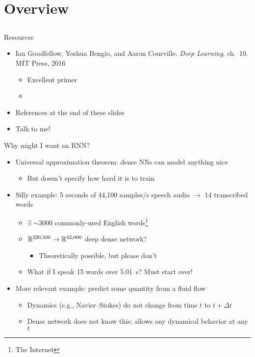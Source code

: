 \section{Overview}
\subsection{}

\begin{frame}{Resources}
    \begin{itemize}
        \item Ian Goodfellow, Yoshua Bengio, and Aaron Courville.
        \emph{Deep Learning}, ch.~10. MIT Press, 2016
        \nocite{GoodfellowDL}
        \begin{itemize}
            \item Excellent primer
            \item {}
        \end{itemize}
        \item References at the end of these slides
        \item Talk to me! \smiley
    \end{itemize}
\end{frame}

\begin{frame}{Why might I want an RNN?}
    \begin{itemize}
        \item<+-> Universal approximation theorem: dense NNs can model anything nice
        \begin{itemize}
            \item But doesn't specify how hard it is to train
        \end{itemize}
        \item<+-> Silly example: 5 seconds of 44,100 samples/s speech audio $\rightarrow$ 14 transcribed words
        \begin{itemize}
            \item $\exists$ $\sim$3000 commonly-used English words\footnote{The Internet}
            \item $\mathbb{R}^{220,500} \to \mathbb{R}^{42,000}$ deep dense network?
            \begin{itemize}
                \item Theoretically possible, but please don't
            \end{itemize}
            \item What if I speak 15 words over 5.01~s?
            Must start over!
        \end{itemize}
        \item<+-> More relevant example: predict some quantity from a fluid flow
        \begin{itemize}
            \item Dynamics (e.g., Navier--Stokes) do not change from time $t$ to $t + \Delta t$
            \item Dense network does not know this; allows any dynamical behavior at any $t$
        \end{itemize}
    \end{itemize}
\end{frame}


